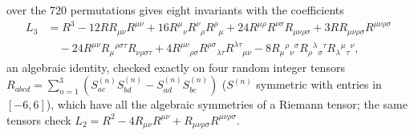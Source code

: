 \documentclass[10pt,a4paper]{article}
\begin{document}
over the 720 permutations gives eight invariants with the coefficients
\begin{align*}
L_3&=R^3-12RR_{\mu\nu}R^{\mu\nu}+16R^\mu{}_\nu R^\nu{}_\rho R^\rho{}_\mu+24R^{\mu\rho}R^{\nu\sigma}R_{\mu\nu\rho\sigma}+3RR_{\mu\nu\rho\sigma}R^{\mu\nu\rho\sigma} \\
&\quad-24R^{\mu\nu}R_\mu{}^{\rho\sigma\tau}R_{\nu\rho\sigma\tau}+4R^{\mu\nu}{}_{\rho\sigma}R^{\rho\sigma}{}_{\lambda\tau}R^{\lambda\tau}{}_{\mu\nu}-8R_\mu{}^\rho{}_\nu{}^\sigma R_\rho{}^\lambda{}_\sigma{}^\tau R_\lambda{}^\mu{}_\tau{}^\nu,
\end{align*}
an algebraic identity, checked exactly on four random integer tensors $R_{abcd}=\sum_{n=1}^3(S^{(n)}_{ac}S^{(n)}_{bd}-S^{(n)}_{ad}S^{(n)}_{bc})$ ($S^{(n)}$ symmetric with entries in $[-6,6]$), which have all the algebraic symmetries of a Riemann tensor; the same tensors check $L_2=R^2-4R_{\mu\nu}R^{\mu\nu}+R_{\mu\nu\rho\sigma}R^{\mu\nu\rho\sigma}$.
\end{document}
